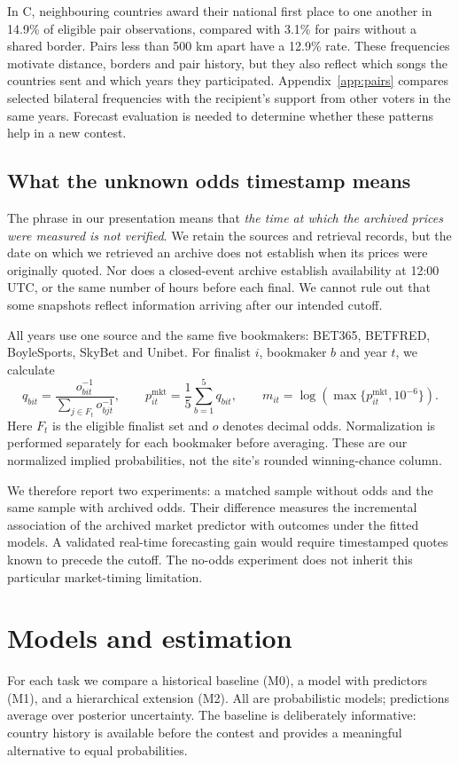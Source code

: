 \documentclass[11pt,a4paper]{article}
\begin{document}
In C, neighbouring countries award their national first place to one another in 14.9\% of eligible pair observations, compared with 3.1\% for pairs without a shared border. Pairs less than 500 km apart have a 12.9\% rate. These frequencies motivate distance, borders and pair history, but they also reflect which songs the countries sent and which years they participated. Appendix~\ref{app:pairs} compares selected bilateral frequencies with the recipient's support from other voters in the same years. Forecast evaluation is needed to determine whether these patterns help in a new contest.

\subsection{What the unknown odds timestamp means}\label{sec:timestamp}
The phrase in our presentation means that \emph{the time at which the archived prices were measured is not verified}. We retain the sources and retrieval records, but the date on which we retrieved an archive does not establish when its prices were originally quoted. Nor does a closed-event archive establish availability at 12:00 UTC, or the same number of hours before each final. We cannot rule out that some snapshots reflect information arriving after our intended cutoff.

All years use one source and the same five bookmakers: BET365, BETFRED, BoyleSports, SkyBet and Unibet. For finalist $i$, bookmaker $b$ and year $t$, we calculate
\begin{equation}
 q_{bit}=\frac{o_{bit}^{-1}}{\sum_{j\in F_t}o_{bjt}^{-1}},\qquad
 p^{\mathrm{mkt}}_{it}=\frac15\sum_{b=1}^{5}q_{bit},\qquad
 m_{it}=\log\!\left(\max\{p^{\mathrm{mkt}}_{it},10^{-6}\}\right).
\end{equation}
Here $F_t$ is the eligible finalist set and $o$ denotes decimal odds. Normalization is performed separately for each bookmaker before averaging. These are our normalized implied probabilities, not the site's rounded winning-chance column. 

We therefore report two experiments: a matched sample without odds and the same sample with archived odds. Their difference measures the incremental association of the archived market predictor with outcomes under the fitted models. A validated real-time forecasting gain would require timestamped quotes known to precede the cutoff. The no-odds experiment does not inherit this particular market-timing limitation.

\section{Models and estimation}
For each task we compare a historical baseline (M0), a model with predictors (M1), and a hierarchical extension (M2). All are probabilistic models; predictions average over posterior uncertainty. The baseline is deliberately informative: country history is available before the contest and provides a meaningful alternative to equal probabilities.
\end{document}
